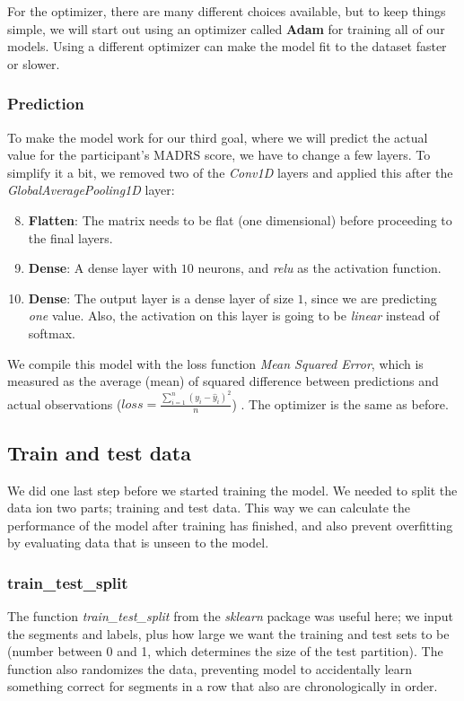 For the optimizer, there are many different choices available,
but to keep things simple, we will start out using an optimizer called \textbf{Adam} for training all of our models. Using a different optimizer can make the 
model fit to the dataset faster or slower. 

\subsubsection{Prediction}
To make the model work for our third goal, where we will predict the actual value for the participant's MADRS score, we have to change a few layers. To simplify it a bit, we removed two of the \textit{Conv1D} layers and applied this after the \textit{GlobalAveragePooling1D} layer:

\begin{enumerate}
      \setcounter{enumi}{7}
      \item \textbf{Flatten}: The matrix needs to be flat (one dimensional) before proceeding to the final layers.
      \item \textbf{Dense}: A dense layer with $10$ neurons, and \textit{relu} as the activation function. 
      \item \textbf{Dense}: The output layer is a dense layer of size $1$, since we are predicting \textit{one} value. 
            Also, the activation on this layer is going to be \textit{linear} instead of softmax.
\end{enumerate}

We compile this model with the loss function \textit{Mean Squared Error}, which is measured as the average (mean) of squared difference between predictions and actual observations ($ loss = \frac{\sum_{i=1}^{n}(y_i-\hat{y}_i)^2}{n} $) \cite{loss_functions}. The optimizer is the same as before.

\subsection{Train and test data}
We did one last step before we started training the model. We needed to split the data ion two parts; training and test data. This way we can calculate the performance of the model after training has finished, and also prevent overfitting by evaluating data that is unseen to the model. 

\subsubsection{train\_test\_split}
The function \textit{train\_test\_split} from the \textit{sklearn} package was useful here; we input the segments and labels, plus how large we want the training and test sets to be (number between 0 and 1, which determines the size of the test partition). The function also randomizes the data, preventing model to accidentally learn something correct for segments in a row that also are chronologically in order.

